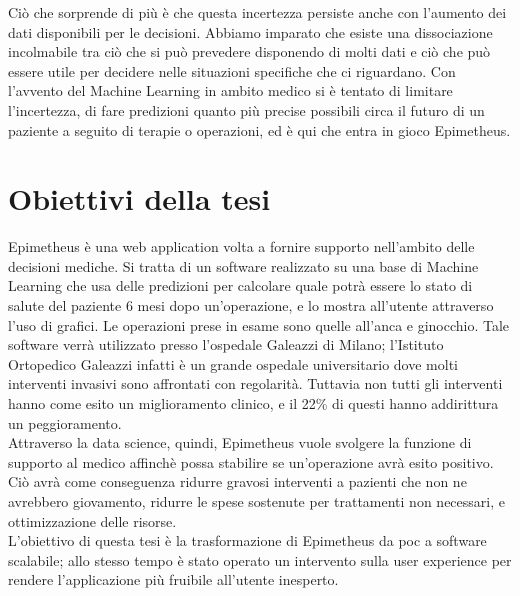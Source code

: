 Ciò che sorprende di più è che questa incertezza persiste anche con l'aumento dei dati disponibili per le decisioni. Abbiamo imparato che esiste una dissociazione incolmabile tra ciò che si può prevedere disponendo di molti dati e ciò che può essere utile per decidere nelle situazioni specifiche che ci riguardano. 
Con l'avvento del Machine Learning in ambito medico si è tentato di limitare l'incertezza, di fare predizioni quanto più precise possibili circa il futuro di un paziente a seguito di terapie o operazioni, ed è qui che entra in gioco Epimetheus.\\

\section{Obiettivi della tesi}
Epimetheus è una web application volta a fornire supporto nell'ambito delle decisioni mediche. Si tratta di un software realizzato su una base di Machine Learning che usa delle  predizioni per calcolare quale potrà essere lo stato di salute del paziente 6 mesi dopo un'operazione, e lo mostra all'utente attraverso l'uso di grafici. Le operazioni prese in esame sono quelle all'anca e ginocchio. Tale software verrà utilizzato presso l'ospedale Galeazzi di Milano; l'Istituto Ortopedico Galeazzi infatti è un grande ospedale universitario dove molti interventi invasivi sono affrontati con regolarità. Tuttavia non tutti gli interventi hanno come esito un miglioramento clinico, e il 22\% di questi hanno addirittura un peggioramento. \\
Attraverso la data science, quindi, Epimetheus vuole svolgere la funzione di supporto al medico affinchè possa stabilire se un'operazione avrà esito positivo. Ciò avrà come conseguenza ridurre gravosi interventi a pazienti che non ne avrebbero giovamento, ridurre le spese sostenute per trattamenti non necessari, e ottimizzazione delle risorse. \\

L'obiettivo di questa tesi è la trasformazione di Epimetheus da \gls{poc} a software scalabile; allo stesso tempo è stato operato un intervento sulla user experience per rendere l'applicazione più fruibile all'utente inesperto.

